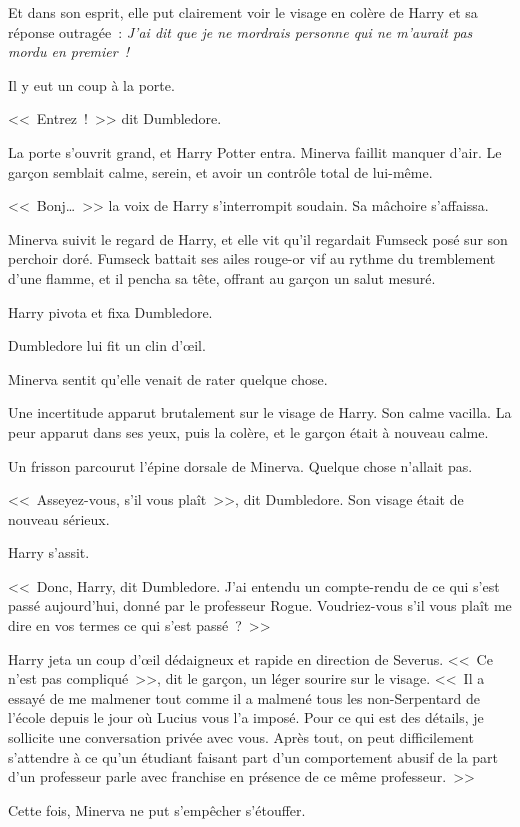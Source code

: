 Et dans son esprit, elle put clairement voir le visage en colère de Harry et sa réponse outragée~: \emph{J'ai dit que je ne mordrais personne qui ne m'aurait pas mordu en premier~!}

Il y eut un coup à la porte.

<<~Entrez~!~>> dit Dumbledore.

La porte s'ouvrit grand, et Harry Potter entra. Minerva faillit manquer d'air. Le garçon semblait calme, serein, et avoir un contrôle total de lui-même.

<<~Bonj…~>> la voix de Harry s'interrompit soudain. Sa mâchoire s'affaissa.

Minerva suivit le regard de Harry, et elle vit qu'il regardait Fumseck posé sur son perchoir doré. Fumseck battait ses ailes rouge-or vif au rythme du tremblement d'une flamme, et il pencha sa tête, offrant au garçon un salut mesuré.

Harry pivota et fixa Dumbledore.

Dumbledore lui fit un clin d'œil.

Minerva sentit qu'elle venait de rater quelque chose.

Une incertitude apparut brutalement sur le visage de Harry. Son calme vacilla. La peur apparut dans ses yeux, puis la colère, et le garçon était à nouveau calme.

Un frisson parcourut l'épine dorsale de Minerva. Quelque chose n'allait pas.

<<~Asseyez-vous, s'il vous plaît~>>, dit Dumbledore. Son visage était de nouveau sérieux.

Harry s'assit.

<<~Donc, Harry, dit Dumbledore. J'ai entendu un compte-rendu de ce qui s'est passé aujourd'hui, donné par le professeur Rogue. Voudriez-vous s'il vous plaît me dire en vos termes ce qui s'est passé~?~>>

Harry jeta un coup d'œil dédaigneux et rapide en direction de Severus. <<~Ce n'est pas compliqué~>>, dit le garçon, un léger sourire sur le visage. <<~Il a essayé de me malmener tout comme il a malmené tous les non-Serpentard de l'école depuis le jour où Lucius vous l'a imposé. Pour ce qui est des détails, je sollicite une conversation privée avec vous. Après tout, on peut difficilement s'attendre à ce qu'un étudiant faisant part d'un comportement abusif de la part d'un professeur parle avec franchise en présence de ce même professeur.~>>

Cette fois, Minerva ne put s'empêcher s'étouffer.

